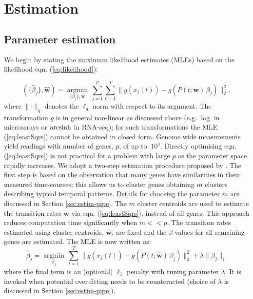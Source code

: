 \section{Estimation}
\label{sec:estimation}

\subsection{Parameter estimation}
\label{sec:parameter-estimation}

We begin by stating the maximum likelihood estimates (MLEs) based on the likelihood eqn. (\ref{eq:likelihood}):

\begin{equation}
  \label{eq:leastSqrs}
  (\lbrace\hat{\beta}_j\rbrace, \hat{\mathbf{w}}) =  \underset{\lbrace\beta_j\rbrace, \mathbf{w}}{\operatorname{argmin}} \, \sum_{j=1}^p \sum_{t=1}^T \lVert g(x_j(t)) - g\left(P(t; \mathbf{w})\,\beta_j \right) \rVert_2^2,%
\end{equation}
where $\lVert \cdot \rVert_q$ denotes the $\ell_q$ norm with respect to its argument.
The transformation $g$ is in general non-linear as discussed above (e.g. $\log$ in microarrays or $\operatorname{arcsinh}$ in RNA-seq); for such transformations the MLE (\ref{eq:leastSqrs}) cannot be obtained in closed form. Genome wide measurements yield readings with number of genes, $p$, of up to $~10^4$. Directly optimising eqn. (\ref{eq:leastSqrs}) is not practical for a problem with large $p$ as the parameter space rapidly increases. We adopt a two-step estimation procedure proposed by \cite{Armond:2013}. The first step is based on the observation that many genes have similarities in their measured time-courses; this allows us to cluster genes obtaining $m$ clusters describing typical temporal patterns. Details for choosing the parameter $m$ are discussed in Section \ref{sec:estim-pipe}. The $m$ cluster centroids are used to estimate the transition rates $\mathbf{w}$ via eqn. (\ref{eq:leastSqrs}), instead of all genes. This approach reduces computation time significantly when $m << p$. 
The transition rates estimated using cluster centroids, $\hat{\mathbf{w}}$, are fixed and the $\beta$ values for all remaining genes are estimated. The MLE is now written as:
\begin{equation}
  \label{eq:leastSqrs.indep}
\hat{\beta}_j  =  \underset{\beta_j}{\operatorname{argmin}} \, \sum_{t=1}^T \lVert g(x_j(t)) - g\left(P(t; \hat{\mathbf{w}})\,\beta_j \right) \rVert_2^2 + \lambda \lVert \beta_j \rVert_1
\end{equation}
where the final term is an (optional) $\ell_1$ penalty with tuning parameter $\lambda$. It is invoked when potential over-fitting needs to be counteracted (choice of $\lambda$ is discussed in Section \ref{sec:estim-pipe}). 

